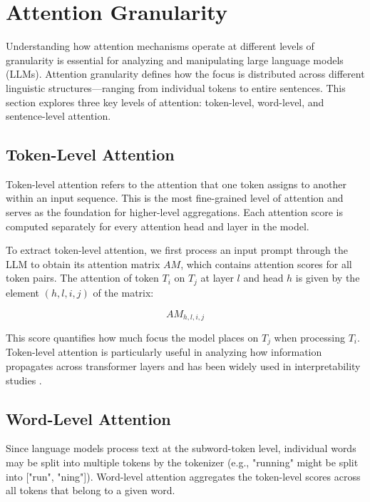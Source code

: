 

\appendix



\section{Attention Granularity}
\label{sec: Attention Granularity}

Understanding how attention mechanisms operate at different levels of granularity is essential for analyzing and manipulating large language models (LLMs). Attention granularity defines how the focus is distributed across different linguistic structures—ranging from individual tokens to entire sentences. This section explores three key levels of attention: token-level, word-level, and sentence-level attention.

\subsection{Token-Level Attention}
Token-level attention refers to the attention that one token assigns to another within an input sequence. This is the most fine-grained level of attention and serves as the foundation for higher-level aggregations. Each attention score is computed separately for every attention head and layer in the model.

To extract token-level attention, we first process an input prompt through the LLM to obtain its attention matrix \( AM \), which contains attention scores for all token pairs. The attention of token \( T_{i} \) on \( T_{j} \) at layer \( l \) and head \( h \) is given by the element \( (h,l,i,j) \) of the matrix:

\[
AM_{h,l,i,j}
\]

This score quantifies how much focus the model places on \( T_j \) when processing \( T_i \). Token-level attention is particularly useful in analyzing how information propagates across transformer layers and has been widely used in interpretability studies \cite{clark2019does, kobayashi2020attention, vig2019multiscale}.

\subsection{Word-Level Attention}
Since language models process text at the subword-token level, individual words may be split into multiple tokens by the tokenizer (e.g., "running" might be split into ["run", "ning"]). Word-level attention aggregates the token-level scores across all tokens that belong to a given word.

